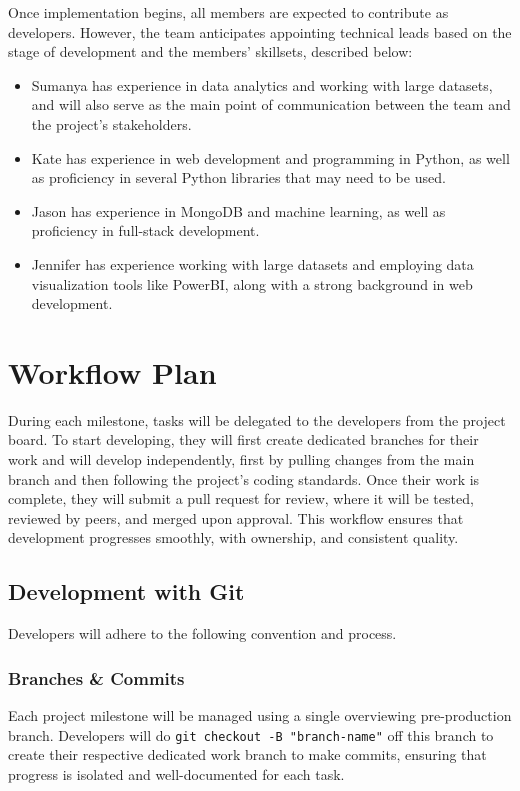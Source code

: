\documentclass{article}
\begin{document}
\noindent Once implementation begins, all members are expected to contribute as
developers. However, the team anticipates appointing technical leads based on
the stage of development and the members' skillsets, described below:

\begin{itemize}
  \item Sumanya has experience in data analytics and working with large
  datasets, and will also serve as the main point of communication between the
  team and the project's stakeholders.
  \item Kate has experience in web development and programming in Python, as
  well as proficiency in several Python libraries that may need to be used.
  \item Jason has experience in MongoDB and machine learning, as well as
  proficiency in full-stack development.
  \item Jennifer has experience working with large datasets and employing data
  visualization tools like PowerBI, along with a strong background in web
  development.
\end{itemize}

\section{Workflow Plan}

During each milestone, tasks will be delegated to the developers from the
project board. To start developing, they will first create dedicated branches
for their work and will develop independently, first by pulling changes from the
main branch and then following the project's coding standards. Once their work
is complete, they will submit a pull request for review, where it will be
tested, reviewed by peers, and merged upon approval. This workflow ensures that
development progresses smoothly, with ownership, and consistent quality.

\subsection{Development with Git}

Developers will adhere to the following convention and process.

\subsubsection{Branches \& Commits}

Each project milestone will be managed using a single overviewing pre-production
branch. Developers will do \texttt{git checkout -B "branch-name"} off this
branch to create their respective dedicated work branch to make commits,
ensuring that progress is isolated and well-documented for each task.
\end{document}
